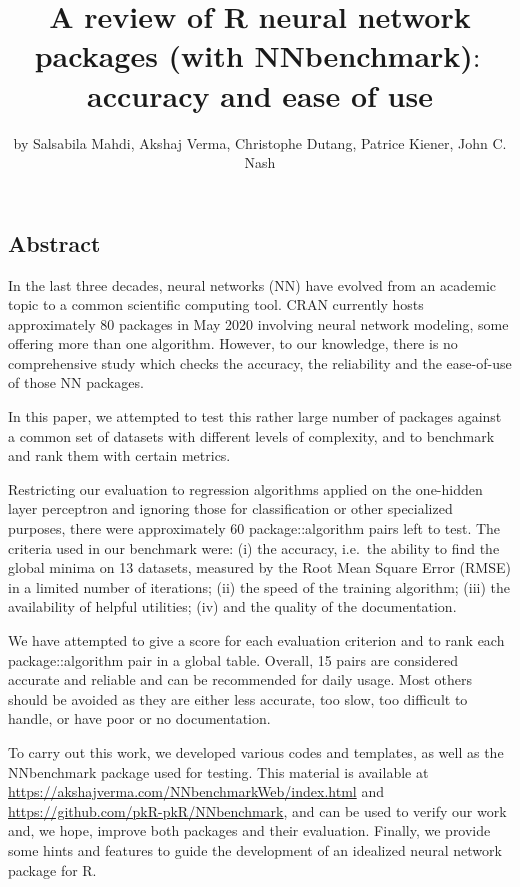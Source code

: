 \title{A review of R neural network packages (with NNbenchmark)\(:\)
accuracy and ease of use}
\author{by Salsabila Mahdi, Akshaj Verma, Christophe Dutang, Patrice
Kiener, John C. Nash}

\maketitle


\hypertarget{abstract}{%
\subsection{Abstract}\label{abstract}}

In the last three decades, neural networks (NN) have evolved from an
academic topic to a common scientific computing tool. CRAN currently
hosts approximately 80 packages in May 2020 involving neural network
modeling, some offering more than one algorithm. However, to our
knowledge, there is no comprehensive study which checks the accuracy,
the reliability and the ease-of-use of those NN packages.

In this paper, we attempted to test this rather large number of packages
against a common set of datasets with different levels of complexity,
and to benchmark and rank them with certain metrics.

Restricting our evaluation to regression algorithms applied on the
one-hidden layer perceptron and ignoring those for classification or
other specialized purposes, there were approximately 60
package::algorithm pairs left to test. The criteria used in our
benchmark were: (i) the accuracy, i.e.~the ability to find the global
minima on 13 datasets, measured by the Root Mean Square Error (RMSE) in
a limited number of iterations; (ii) the speed of the training
algorithm; (iii) the availability of helpful utilities; (iv) and the
quality of the documentation.

We have attempted to give a score for each evaluation criterion and to
rank each package::algorithm pair in a global table. Overall, 15 pairs
are considered accurate and reliable and can be recommended for daily
usage. Most others should be avoided as they are either less accurate,
too slow, too difficult to handle, or have poor or no documentation.

To carry out this work, we developed various codes and templates, as
well as the NNbenchmark package used for testing. This material is
available at \url{https://akshajverma.com/NNbenchmarkWeb/index.html} and
\url{https://github.com/pkR-pkR/NNbenchmark}, and can be used to verify
our work and, we hope, improve both packages and their evaluation.
Finally, we provide some hints and features to guide the development of
an idealized neural network package for R.

